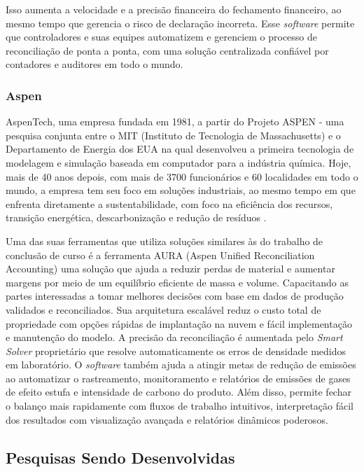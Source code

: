 Isso aumenta a velocidade e a precisão financeira do fechamento financeiro, ao mesmo tempo que gerencia o risco de declaração incorreta. Esse \textit{software} permite que controladores e suas equipes automatizem e gerenciem o processo de reconciliação de ponta a ponta, com uma solução centralizada confiável por contadores e auditores em todo o mundo.

\subsubsection{Aspen}

AspenTech, uma empresa fundada em 1981, a partir do Projeto ASPEN - uma pesquisa conjunta entre o MIT (Instituto de Tecnologia de Massachusetts) e o Departamento de Energia dos EUA na qual desenvolveu a primeira tecnologia de modelagem e simulação baseada em computador para a indústria química. Hoje, mais de 40 anos depois, com mais de 3700 funcionários e 60 localidades em todo o mundo, a empresa tem seu foco em soluções industriais, ao mesmo tempo em que enfrenta diretamente a sustentabilidade, com foco na eficiência dos recursos, transição energética, descarbonização e redução de resíduos \cite{aspen}.

Uma das suas ferramentas que utiliza soluções similares às do trabalho de conclusão de curso é a ferramenta AURA (Aspen Unified Reconciliation Accounting) uma solução que ajuda a reduzir perdas de material e aumentar margens por meio de um equilíbrio eficiente de massa e volume. Capacitando as partes interessadas a tomar melhores decisões com base em dados de produção validados e reconciliados. Sua arquitetura escalável reduz o custo total de propriedade com opções rápidas de implantação na nuvem e fácil implementação e manutenção do modelo. A precisão da reconciliação é aumentada pelo \textit{Smart Solver} proprietário que resolve automaticamente os erros de densidade medidos em laboratório. O \textit{software} também ajuda a atingir metas de redução de emissões ao automatizar o rastreamento, monitoramento e relatórios de emissões de gases de efeito estufa e intensidade de carbono do produto. Além disso, permite fechar o balanço mais rapidamente com fluxos de trabalho intuitivos, interpretação fácil dos resultados com visualização avançada e relatórios dinâmicos poderosos.

\subsection{Pesquisas Sendo Desenvolvidas}

